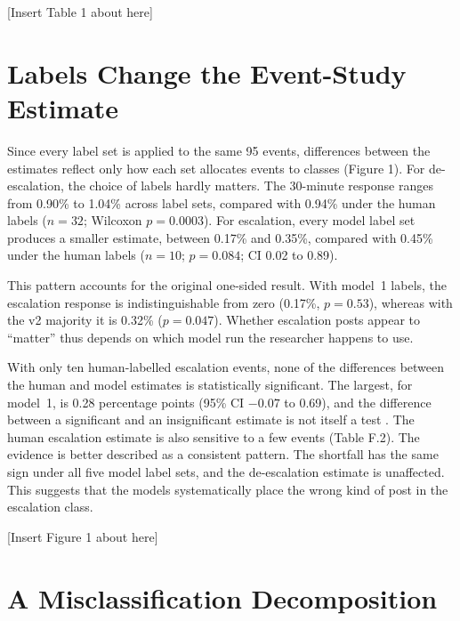 \documentclass[12pt]{article}
\begin{document}
\begin{center}[Insert Table 1 about here]\end{center}

\section{Labels Change the Event-Study Estimate}

Since every label set is applied to the same 95 events, differences between the estimates reflect only how each set allocates events to classes (Figure 1). For de-escalation, the choice of labels hardly matters. The 30-minute response ranges from 0.90\% to 1.04\% across label sets, compared with 0.94\% under the human labels ($n = 32$; Wilcoxon $p = 0.0003$). For escalation, every model label set produces a smaller estimate, between 0.17\% and 0.35\%, compared with 0.45\% under the human labels ($n = 10$; $p = 0.084$; CI 0.02 to 0.89).

This pattern accounts for the original one-sided result. With model~1 labels, the escalation response is indistinguishable from zero (0.17\%, $p = 0.53$), whereas with the v2 majority it is 0.32\% ($p = 0.047$). Whether escalation posts appear to ``matter'' thus depends on which model run the researcher happens to use.

With only ten human-labelled escalation events, none of the differences between the human and model estimates is statistically significant. The largest, for model~1, is 0.28 percentage points (95\% CI $-0.07$ to 0.69), and the difference between a significant and an insignificant estimate is not itself a test \citep{gelman2006}. The human escalation estimate is also sensitive to a few events (Table F.2). The evidence is better described as a consistent pattern. The shortfall has the same sign under all five model label sets, and the de-escalation estimate is unaffected. This suggests that the models systematically place the wrong kind of post in the escalation class.

\begin{center}[Insert Figure 1 about here]\end{center}

\section{A Misclassification Decomposition}
\end{document}
